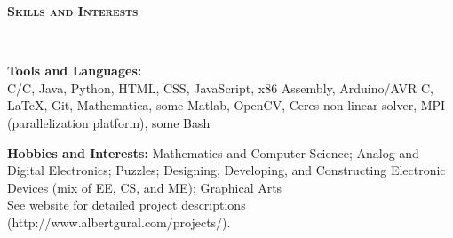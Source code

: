 \documentclass{article}
\newenvironment{changemargin}[2]{%
  \begin{list}{}{%
    \setlength{\topsep}{0pt}%
    \setlength{\leftmargin}{#1}%
    \setlength{\rightmargin}{#2}%
    \setlength{\listparindent}{\parindent}%
    \setlength{\itemindent}{\parindent}%
    \setlength{\parsep}{\parskip}%
  }%
  \item[]}{\end{list}
}
\newcommand{\lineover}{
	\begin{changemargin}{-0.05in}{-0.05in}
		\vspace*{-8pt}
		\hrulefill \\
		\vspace*{-2pt}
	\end{changemargin}
}
\newcommand{\header}[1]{
	\begin{changemargin}{-0.5in}{-0.5in}
		{\large \textbf{\scshape{#1}}}\\
  	\lineover
	\end{changemargin}
}
\newenvironment{body} {
	\vspace*{-16pt}
	\begin{changemargin}{-0.25in}{-0.5in}
  }	
	{\end{changemargin}
}
\newcommand{\CC}{C\nolinebreak\hspace{-.05em}\raisebox{.4ex}{\tiny\bf +}\nolinebreak\hspace{-.10em}\raisebox{.4ex}{\tiny\bf +}}
\begin{document}
\smallskip


\header{Skills and Interests}

\begin{body}
	\vspace{14pt}
	\textbf{Tools and Languages:} \\
	C/\CC, Java, Python, HTML, CSS, JavaScript, x86 Assembly, Arduino/AVR C, \LaTeX, Git, Mathematica, some Matlab, OpenCV, Ceres non-linear solver, MPI (parallelization platform), some Bash \\
	
	\medskip
	
	\textbf{Hobbies and Interests:} Mathematics and Computer Science; Analog and Digital Electronics; Puzzles; Designing, Developing, and Constructing Electronic Devices (mix of EE, CS, and ME); Graphical Arts \\ See website for detailed project descriptions (http://www.albertgural.com/projects/). \\
\end{body}

\smallskip
\end{document}
